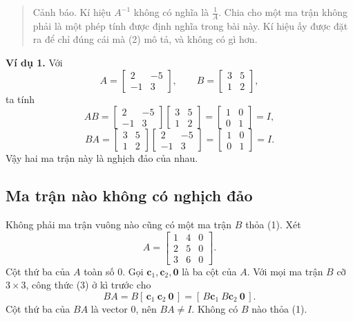 \documentclass[12pt,a4paper]{article}
\begin{document}
\begin{quote}
Cảnh báo. Kí hiệu \(A^{-1}\) không có nghĩa là \(\frac1A\). Chia cho một ma trận không phải là một phép tính được định nghĩa trong bài này. Kí hiệu ấy được đặt ra để chỉ đúng cái mà (2) mô tả, và không có gì hơn.
\end{quote}

\textbf{Ví dụ 1.} Với
$$
A=\left[ \begin{array}{rr} 2 & -5\\ -1 & 3 \end{array} \right],\qquad
B=\left[ \begin{array}{rr} 3 & 5\\ 1 & 2 \end{array} \right],
$$
ta tính
$$
AB=\left[ \begin{array}{rr} 2 & -5\\ -1 & 3 \end{array} \right]\left[ \begin{array}{rr} 3 & 5\\ 1 & 2 \end{array} \right]=\left[ \begin{array}{rr} 1 & 0\\ 0 & 1 \end{array} \right]=I,
$$
$$
BA=\left[ \begin{array}{rr} 3 & 5\\ 1 & 2 \end{array} \right]\left[ \begin{array}{rr} 2 & -5\\ -1 & 3 \end{array} \right]=\left[ \begin{array}{rr} 1 & 0\\ 0 & 1 \end{array} \right]=I.
$$
Vậy hai ma trận này là nghịch đảo của nhau.

\subsection{Ma trận nào không có nghịch đảo}

Không phải ma trận vuông nào cũng có một ma trận \(B\) thỏa (1). Xét
$$
A=\left[ \begin{array}{rrr} 1 & 4 & 0\\ 2 & 5 & 0\\ 3 & 6 & 0 \end{array} \right].
$$
Cột thứ ba của \(A\) toàn số \(0\). Gọi \(\mathbf{c}_1,\mathbf{c}_2,\mathbf{0}\) là ba cột của \(A\). Với mọi ma trận \(B\) cỡ \(3\times3\), công thức (3) ở kì trước cho
$$
BA=B[\,\mathbf{c}_1\ \mathbf{c}_2\ \mathbf{0}\,]=[\,B\mathbf{c}_1\ B\mathbf{c}_2\ \mathbf{0}\,].
$$
Cột thứ ba của \(BA\) là vector \(0\), nên \(BA\neq I\). Không có \(B\) nào thỏa (1).
\end{document}
